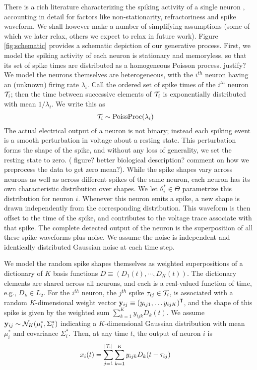 There is a rich literature characterizing the spiking activity of a single neuron \citep{}, accounting in detail for factors like non-stationarity, 
refractoriness and spike waveform. We shall however make a number of simplifying assumptions (some of which we later relax, others we expect to relax in future work). Figure \ref{fig:schematic} provides a schematic depiction of our generative process.
First, we model the spiking activity of each neuron is 
stationary and memoryless, so that its set of spike times are 
distributed as a homogeneous Poisson process. 
{\color{red} justify?} We model the neurons themselves are heterogeneous, with the $i^{th}$ neuron having
an (unknown) firing rate $\lambda_i$. Call the ordered set of spike times of the $i^{th}$ neuron $\mathcal{T}_i$; then the time between successive elements of $\mathcal{T}_i$ is 
exponentially distributed with mean $1/\lambda_i$. We write this as
\begin{align}
  \mathcal{T}_i &\sim \text{PoissProc}(\lambda_i)
\end{align}
The actual electrical output of a neuron is not binary; instead each spiking event is a smooth perturbation in voltage about a
resting state. This perturbation forms the shape of the spike, and without any loss of generality, we set the resting state to zero. 
{(\color{red} figure? better biological description? comment on how we preprocess the data to get zero mean?)}. 
While the spike shapes vary across neurons as well as across different spikes of the same neuron, each 
neuron has its own characteristic distribution over shapes. 
We let $\theta^*_i \in \Theta$ parametrize this distribution for neuron $i$.
Whenever this neuron emits a 
spike, a new shape is drawn independently from the corresponding distribution. %
This waveform is then offset to the time of the spike, and contributes to the voltage trace associate with that spike. The complete detected output of the neuron is the 
superposition of all these spike waveforms plus noise.  
We assume the noise is independent and  identically distributed Gaussian noise at each time step.

We model the random spike shapes themselves as weighted superpositions of a dictionary of $K$ basis functions $D \equiv (D_1(t), \cdots, D_K(t))$. The
dictionary elements are shared across all neurons, and each is a real-valued function of time, e.g., $D_k \in L_2$.
For the $i^{th}$ neuron, the $j^{th}$ spike $\tau_{ij} \in \mathcal{T}_i$, is associated with a random $K$-dimensional weight vector $\mathbf{y}_{ij} \equiv (y_{ij1}, \ldots y_{ijK})^{\mathsf{T}}$, and the 
shape of this spike is given by the weighted sum $\sum_{k=1}^K y_{ijk} D_k(t)$. We assume $\mathbf{y}_{ij} \sim \mathcal{N}_K(\mu^*_i, \Sigma^*_i)$ indicating a $K$-dimensional Gaussian distribution with mean $\mu^*_i$ and covariance $\Sigma^*_i$. Then, at any time $t$, the output of neuron $i$ is
\begin{align}
  x_{i}(t) &= \sum_{j=1}^{|\mathcal{T}_i|} \sum_{k=1}^K y_{ijk} D_k(t - \tau_{ij})
\end{align}




